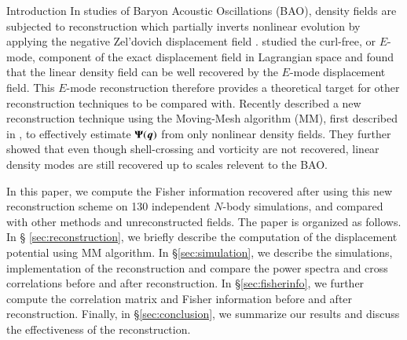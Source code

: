 \begin{section}{Introduction}
  In studies of Baryon Acoustic Oscillations (BAO), density fields are
  subjected to reconstruction which partially inverts nonlinear
  evolution by applying the negative Zel'dovich displacement field \citep{bib:Eisenstein2007,bib:Zel1970}.
  \citet{bib:Yu2016} studied the curl-free, or $E$-mode, component of 
  the exact displacement field in Lagrangian
  space and found that the linear density field can be well recovered by
  the $E$-mode displacement field.
  This $E$-mode reconstruction therefore provides a theoretical 
  target for other reconstruction techniques to be compared with.
  Recently \citet{bib:Zhu2016,bib:ZhuH2016} described a new reconstruction 
  technique using the Moving-Mesh
  algorithm (MM), first described in \citep{bib:Pen1995,bib:Pen1998},
  to effectively estimate $\boldsymbol{\Psi}(\boldsymbol{q})$ from only nonlinear
  density fields.  They further showed that even though shell-crossing
  and vorticity are not recovered, linear density modes are still 
  recovered up to scales relevent to the BAO.

  In this paper, we compute the Fisher information recovered after
  using this new reconstruction scheme on 130 independent $N$-body
  simulations, and compared with other methods and unreconstructed
  fields.  The paper is organized as follows.  In \S
  \ref{sec:reconstruction}, we briefly
  describe the computation of the displacement potential using MM
  algorithm. In \S \ref{sec:simulation}, we describe  
  the simulations, implementation of the reconstruction and compare 
  the power spectra and cross correlations before and after reconstruction.  
  In \S \ref{sec:fisherinfo}, we further compute the correlation matrix 
  and Fisher information before and
  after reconstruction.  Finally, in \S \ref{sec:conclusion}, we summarize 
  our results and 
  discuss the effectiveness of the reconstruction.


\end{section}

